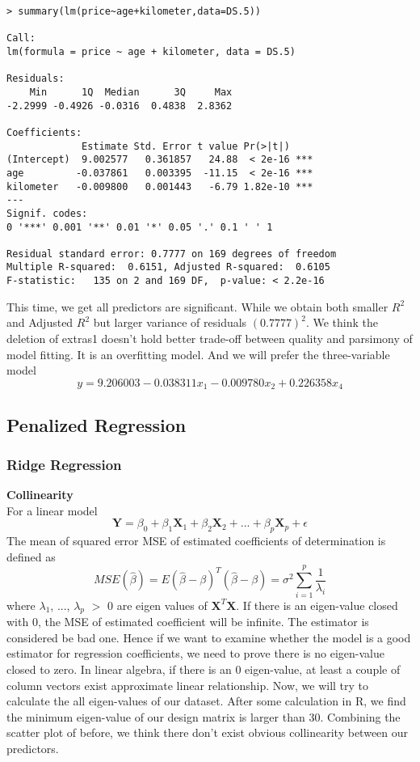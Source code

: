 \documentclass[a4paper]{article}
\begin{document}
\begin{verbatim}
> summary(lm(price~age+kilometer,data=DS.5))

Call:
lm(formula = price ~ age + kilometer, data = DS.5)

Residuals:
    Min      1Q  Median      3Q     Max
-2.2999 -0.4926 -0.0316  0.4838  2.8362

Coefficients:
             Estimate Std. Error t value Pr(>|t|)    
(Intercept)  9.002577   0.361857   24.88  < 2e-16 ***
age         -0.037861   0.003395  -11.15  < 2e-16 ***
kilometer   -0.009800   0.001443   -6.79 1.82e-10 ***
---
Signif. codes:  
0 '***' 0.001 '**' 0.01 '*' 0.05 '.' 0.1 ' ' 1

Residual standard error: 0.7777 on 169 degrees of freedom
Multiple R-squared:  0.6151, Adjusted R-squared:  0.6105
F-statistic:   135 on 2 and 169 DF,  p-value: < 2.2e-16

\end{verbatim}
This time, we get all predictors are significant. While we obtain both smaller $R^2$ and Adjusted $R^2$ but larger variance of residuals $(0.7777)^2$. We think the deletion of extras1 doesn't hold better trade-off between quality and parsimony of model fitting. It is an overfitting model. And we will prefer the three-variable model \[y = 9.206003 - 0.038311x_1 - 0.009780x_2 + 0.226358x_4\] 












\subsection{Penalized Regression}

\subsubsection{Ridge Regression}

\textbf{Collinearity}\\
For a linear model \[\textbf{Y}=\beta_0 + \beta_1 \textbf{X}_1 + \beta_2 \textbf{X}_2 + ... + \beta_p \textbf{X}_p + \epsilon\] The mean of squared error MSE of estimated coefficients of determination is defined as \[MSE(\hat{\beta}) = E(\hat{\beta}-\beta)^T(\hat{\beta}-\beta) = \sigma^2 \sum_{i=1}^{p} \frac{1}{\lambda_i}\] where $\lambda_1$, ..., $\lambda_p$ $>$ 0 are eigen values of $\textbf{X}^T\textbf{X}$. If there is an eigen-value closed with 0, the MSE of estimated coefficient will be infinite. The estimator is considered be bad one. Hence if we want to examine whether the model is a good estimator for regression coefficients, we need to prove there is no eigen-value closed to zero. In linear algebra, if there is an 0 eigen-value, at least a couple of column vectors exist approximate linear relationship. Now, we will try to calculate the all eigen-values of our dataset. After some calculation in R, we find the minimum eigen-value of our design matrix is larger than 30. Combining the scatter plot of before, we think there don't exist obvious collinearity between our predictors.\\
\end{document}
